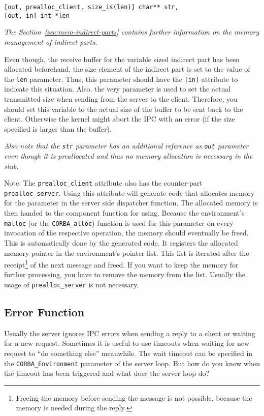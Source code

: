 \begin{verbatim}
[out, prealloc_client, size_is(len)] char** str,
[out, in] int *len
\end{verbatim}

{\em The Section~\ref{sec:mem-indirect-parts} contains further information on
the memory management of indirect parts.}

Even though, the receive buffer for the variable sized indirect part has been
allocated beforehand, the size element of the indirect part is set to the
value of the \verb|len| parameter.  Thus, this parameter should have the
\verb|[in]| attribute to indicate this situation.  Also, the very parameter is
used to set the actual transmitted size when sending from the server to the
client.  Therefore, you should set this variable to the actual size of the
buffer to be sent back to the client.  Otherwise the kernel might abort the
IPC with an error (if the size specified is larger than the buffer).

{\em Also note that the \verb|str| parameter has an additional reference as
\verb|out| parameter even though it is preallocated and thus no memory
allocation is necessary in the stub.}

Note: The \verb|prealloc_client| attribute also has the counter-part
\verb|prealloc_server|.  Using this attribute will generate code that
allocates memory for the parameter in the server side dispatcher function.
The allocated memory is then handed to the component function for using.
Because the environment's \verb|malloc| (or the \verb|CORBA_alloc|) function
is used for this parameter on every invocation of the respective operation,
the memory should eventually be freed.  This is automatically done by the
generated code.  It registers the allocated memory pointer in the
environment's pointer list.  This list is iterated after the
receipt\footnote{Freeing the memory before sending the message is not possible,
because the memory is needed during the reply.} of the next message and freed.
If you want to keep the memory for further processing, you have to remove the
memory from the list.  Usually the usage of \verb|prealloc_server| is not
necessary.

\subsection{Error Function}

Usually the server ignores IPC errors when sending a reply to a client or
waiting for a new request. Sometimes it is useful to use timeouts when waiting
for new request to ``do something else'' meanwhile. The wait timeout can be
specified in the \verb|CORBA_Environment| parameter of the server loop. But
how do you know when the timeout has been triggered and what does the server
loop do?

